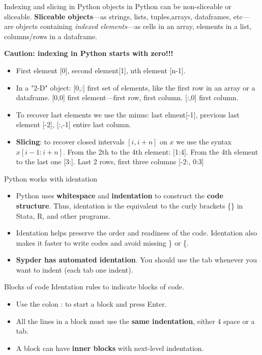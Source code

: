 \documentclass[10pt,aspectratio=169,xcolor=x11names,compress,dvipsnames]{beamer}
\begin{document}
\begin{frame}{Indexing and slicing in Python}
    objects in Python can be non-sliceable or sliceable. \textbf{Sliceable objects}---as strings, lists, tuples,arrays, dataframes, etc--- are objects containing \textit{indexed elements}---as cells in an array, elements in a list, columns/rows in a dataframe.

   \textbf{ Caution: indexing in Python starts with zero!!!}
   \begin{itemize}
       \item 	First element [0], second element[1], nth element [n-1].
       \item In a "2-D" object: [0,:] first set of elements, like the first row in an array or a dataframe. [0,0] first element---first row, first column. [:,0] first column.
       
       \item To recover last elements we use the minus: last elment[-1], previous last element [-2], [:,-1] entire last column.
       \item \textbf{Slicing}: to recover closed intervals $[i,i+n]$ on $x$ we use the syntax $x[i-1:i+n]$.	From the 2th to the 4th element: [1:4]. From the 4th element to the last one [3:]. Last 2 rows, first three columns [-2:, 0:3]
   \end{itemize}
\end{frame}


\begin{frame}{Python works with identation}

\begin{itemize}
    \item Python uses \textbf{whitespace }and \textbf{indentation} to construct the \textbf{code structure}. Thus, identation is the equivalent to the curly brackets \{\} in Stata, R, and other programs.
    \item Identation helps preserve the order and readiness of the code. Identation also makes it faster to write codes and avoid missing \} or \{.
    \item \textbf{Sypder has automated identation}. You should use the tab whenever you want to indent (each tab one indent).
\end{itemize}
    
    


 
\end{frame}

 \begin{frame}{Blocks of code}
Identation rules to indicate blocks of code.
\begin{itemize}
    \item Use the colon : to start a block and press Enter.
    \item All the lines in a block must use the \textbf{same indentation}, either 4 space or a tab.
    \item A block can have \textbf{inner blocks} with next-level indentation.
\end{itemize}



\end{frame}
\end{document}
